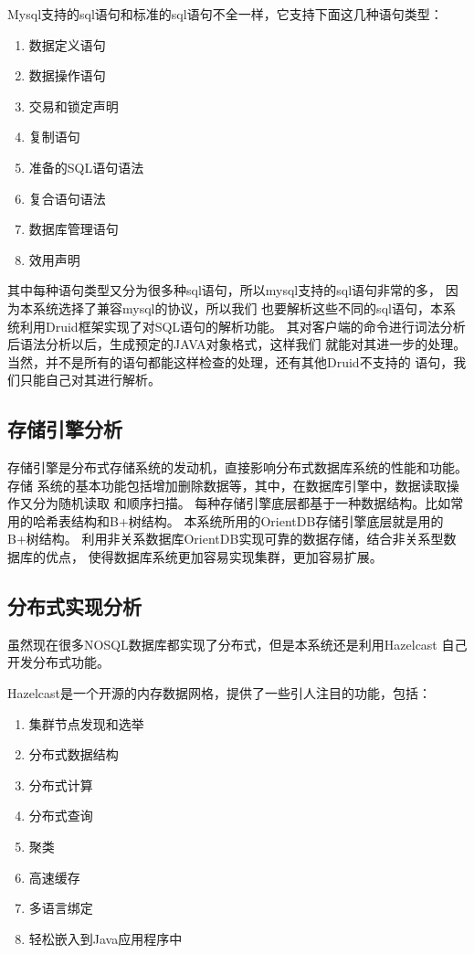 Mysql支持的sql语句和标准的sql语句不全一样，它支持下面这几种语句类型：
\begin{enumerate}
\item 数据定义语句     
\item 数据操作语句     
\item 交易和锁定声明     
\item 复制语句     
\item 准备的SQL语句语法     
\item 复合语句语法     
\item 数据库管理语句     
\item 效用声明  
\end{enumerate}   
其中每种语句类型又分为很多种sql语句，所以mysql支持的sql语句非常的多，
因为本系统选择了兼容mysql的协议，所以我们
也要解析这些不同的sql语句，本系统利用Druid框架实现了对SQL语句的解析功能。
其对客户端的命令进行词法分析后语法分析以后，生成预定的JAVA对象格式，这样我们
就能对其进一步的处理。当然，并不是所有的语句都能这样检查的处理，还有其他Druid不支持的
语句，我们只能自己对其进行解析。
\subsection{存储引擎分析}
存储引擎是分布式存储系统的发动机，直接影响分布式数据库系统的性能和功能。
存储
系统的基本功能包括增加删除数据等，其中，在数据库引擎中，数据读取操作又分为随机读取
和顺序扫描。
每种存储引擎底层都基于一种数据结构。比如常用的哈希表结构和B+树结构。
本系统所用的OrientDB存储引擎底层就是用的B+树结构。
利用非关系数据库OrientDB实现可靠的数据存储，结合非关系型数据库的优点，
使得数据库系统更加容易实现集群，更加容易扩展。
\subsection{分布式实现分析}
虽然现在很多NOSQL数据库都实现了分布式，但是本系统还是利用Hazelcast
自己开发分布式功能。

Hazelcast是一个开源的内存数据网格，提供了一些引人注目的功能，包括：
\begin{enumerate}
	\item 集群节点发现和选举
	\item 分布式数据结构
\item 	分布式计算
	\item 分布式查询
	\item 聚类
	\item 高速缓存
	\item 多语言绑定
\item 	轻松嵌入到Java应用程序中
\end{enumerate}

